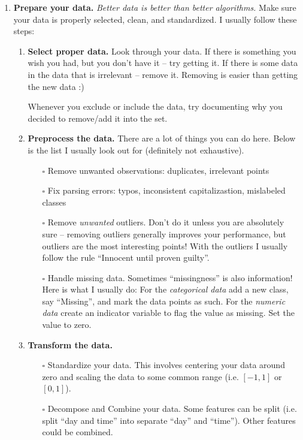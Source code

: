 \begin{enumerate}
\item {\bf Prepare your data.} {\em Better data is better than better algorithms.} Make sure your data is properly selected, clean, and standardized. I usually follow these steps:
    \begin{enumerate}
    \item {\bf Select proper data.} Look through your data. If there is something you wish you had, but you don't have it -- try getting it.
    If there is some data in the data that is irrelevant -- remove it. Removing is easier than getting the new data :)

    Whenever you exclude or include the data, try documenting why you decided to remove/add it into the set.
    \item {\bf Preprocess the data.}
    There are a lot of things you can do here. Below is the list I usually look out for (definitely not exhaustive).
        \begin{itemize}
        \item[$\square$] Remove unwanted observations: duplicates, irrelevant points
        \item[$\square$] Fix parsing errors: typos, inconsistent capitalizastion, mislabeled classes
        \item[$\square$] Remove {\em unwanted} outliers.
        Don't do it unless you are absolutely sure -- removing outliers generally improves your performance, but outliers are the most interesting points!
        With the outliers I usually follow the rule ``Innocent until proven guilty''.
        \item[$\square$] Handle missing data. Sometimes ``missingness'' is also information! Here is what I usually do:
        For the {\em categorical data} add a new class, say ``Missing'', and mark the data points as such.
        For the {\em numeric data} create an indicator variable to flag the value as missing.
        Set the value to zero.
        \end{itemize}
    \item{\bf Transform the data.}
        \begin{itemize}
        \item[$\square$] Standardize your data. This involves centering your data around zero and scaling the data to some common range (i.e. $[-1, 1]$ or $[0, 1]$).
        \item[$\square$] Decompose and Combine your data.
        Some features can be split (i.e. split ``day and time'' into separate ``day'' and ``time'').
        Other features could be combined.
        \end{itemize}
    \end{enumerate}


\end{enumerate}
